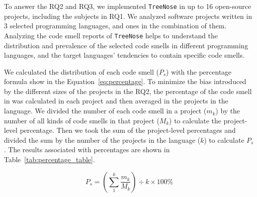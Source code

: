 %
To answer the RQ2 and RQ3, we implemented \texttt{TreeNose} in up to 16
open-source projects, including the subjects in RQ1. We analyzed software
projects written in 3 selected programming languages, and ones in the
%
%
combination of them.
%
%
Analyzing the code smell reports of \texttt{TreeNose}
helps to understand the distribution and prevalence of the selected code smells
in different programming languages, and the target languages'
tendencies to contain specific code smells.




We calculated the distribution of each code smell ($P_{s}$) with the percentage
formula show in the Equation~\ref{eq:percentage}. To minimize the bias
introduced by the different sizes of the projects in the RQ2, the percentage of
the code smell in was calculated in each project and then averaged in the
projects in the language. We divided the number of each code smell in a project
($m_{k}$) by the number of all kinds of code smells in that project ({$M_{k}$})
to calculate the project-level percentage. Then we took the sum of the
project-level percentages and divided the sum by the number of the projects in
the language ($k$) to calculate $P_{s}$. The results associated with percentages
are shown in Table~\ref{tab:percentage_table}.

\vspace{-0.5em}

\begin{equation}
P_{s} = \left( \sum_{1}^{k}\frac{{m_{k}}}{M_{k}} \right) \div {k} \times 100\%
\label{eq:percentage}
\end{equation}

